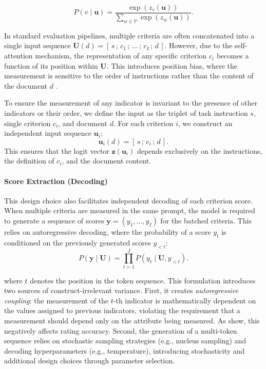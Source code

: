 \begin{equation}
    P(v \mid \mathbf{u}) = \frac{\exp(z_v(\mathbf{u}))}{\sum_{w \in \mathcal{V}} \exp(z_w(\mathbf{u}))}.
\end{equation}

In standard evaluation pipelines, multiple criteria are often concatenated into a single input sequence $\mathbf{U}(d) = [\, s \,;\, c_1 \,;\, \dots \,;\, c_I \,;\, d \,]$. However, due to the self-attention mechanism, the representation of any specific criterion $c_i$ becomes a function of its position within $\mathbf{U}$. This introduces position bias, where the measurement is sensitive to the order of instructions rather than the content of the document $d$ \citep{shi_judging_2025}.

To ensure the measurement of any indicator is invariant to the presence of other indicators or their order, we define the input as the triplet of task instruction $s$, single criterion $c_i$, and document $d$. For each criterion $i$, we construct an independent input sequence $\mathbf{u}_i$:
\begin{equation}\label{eq:eval_triplet}
    \mathbf{u}_i(d) = [\, s \,;\, c_i \,;\, d \,].
\end{equation}
This ensures that the logit vector $\mathbf{z}(\mathbf{u}_i)$ depends exclusively on the instructions, the definition of $c_i$, and the document content.

\paragraph{Score Extraction (Decoding)}
This design choice also facilitates independent decoding of each criterion score. When multiple criteria are measured in the same prompt, the model is required to generate a sequence of scores $\mathbf{y}=(y_1,\dots,y_I)$ for the batched criteria. This relies on autoregressive decoding, where the probability of a score $y_t$ is conditioned on the previously generated scores $y_{<t}$:
\begin{equation}
    P(\mathbf{y} \mid \mathbf{U}) = \prod_{t=1}^{J} P(y_t \mid \mathbf{U}, y_{<t}).
\end{equation}

where $t$ denotes the position in the token sequence. This formulation introduces two sources of construct-irrelevant variance. First, it creates \textit{autoregressive coupling}: the measurement of the $t$-th indicator is mathematically dependent on the values assigned to previous indicators, violating the requirement that a measurement should depend only on the attribute being measured. As \citep{stureborgLargeLanguageModels2024} show, this negatively affects rating accuracy. Second, the generation of a multi-token sequence relies on stochastic sampling strategies (e.g., nucleus sampling) and decoding hyperparameters (e.g., temperature), introducing stochasticity and additional design choices through parameter selection.

